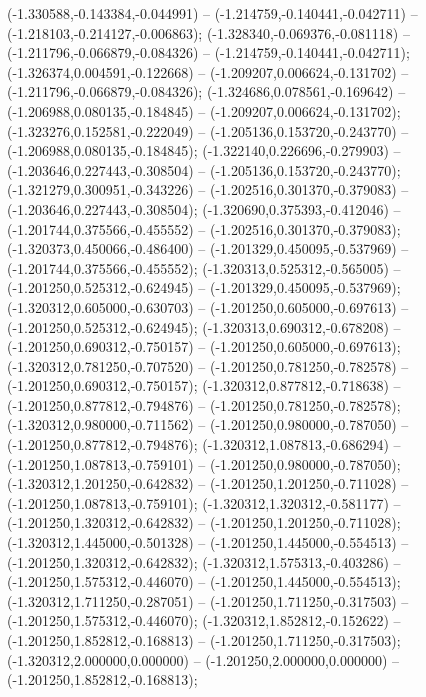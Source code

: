  (-1.330588,-0.143384,-0.044991) -- (-1.214759,-0.140441,-0.042711) -- (-1.218103,-0.214127,-0.006863);
 (-1.328340,-0.069376,-0.081118) -- (-1.211796,-0.066879,-0.084326) -- (-1.214759,-0.140441,-0.042711);
 (-1.326374,0.004591,-0.122668) -- (-1.209207,0.006624,-0.131702) -- (-1.211796,-0.066879,-0.084326);
 (-1.324686,0.078561,-0.169642) -- (-1.206988,0.080135,-0.184845) -- (-1.209207,0.006624,-0.131702);
 (-1.323276,0.152581,-0.222049) -- (-1.205136,0.153720,-0.243770) -- (-1.206988,0.080135,-0.184845);
 (-1.322140,0.226696,-0.279903) -- (-1.203646,0.227443,-0.308504) -- (-1.205136,0.153720,-0.243770);
 (-1.321279,0.300951,-0.343226) -- (-1.202516,0.301370,-0.379083) -- (-1.203646,0.227443,-0.308504);
 (-1.320690,0.375393,-0.412046) -- (-1.201744,0.375566,-0.455552) -- (-1.202516,0.301370,-0.379083);
 (-1.320373,0.450066,-0.486400) -- (-1.201329,0.450095,-0.537969) -- (-1.201744,0.375566,-0.455552);
 (-1.320313,0.525312,-0.565005) -- (-1.201250,0.525312,-0.624945) -- (-1.201329,0.450095,-0.537969);
 (-1.320312,0.605000,-0.630703) -- (-1.201250,0.605000,-0.697613) -- (-1.201250,0.525312,-0.624945);
 (-1.320313,0.690312,-0.678208) -- (-1.201250,0.690312,-0.750157) -- (-1.201250,0.605000,-0.697613);
 (-1.320312,0.781250,-0.707520) -- (-1.201250,0.781250,-0.782578) -- (-1.201250,0.690312,-0.750157);
 (-1.320312,0.877812,-0.718638) -- (-1.201250,0.877812,-0.794876) -- (-1.201250,0.781250,-0.782578);
 (-1.320312,0.980000,-0.711562) -- (-1.201250,0.980000,-0.787050) -- (-1.201250,0.877812,-0.794876);
 (-1.320312,1.087813,-0.686294) -- (-1.201250,1.087813,-0.759101) -- (-1.201250,0.980000,-0.787050);
 (-1.320312,1.201250,-0.642832) -- (-1.201250,1.201250,-0.711028) -- (-1.201250,1.087813,-0.759101);
 (-1.320312,1.320312,-0.581177) -- (-1.201250,1.320312,-0.642832) -- (-1.201250,1.201250,-0.711028);
 (-1.320312,1.445000,-0.501328) -- (-1.201250,1.445000,-0.554513) -- (-1.201250,1.320312,-0.642832);
 (-1.320312,1.575313,-0.403286) -- (-1.201250,1.575312,-0.446070) -- (-1.201250,1.445000,-0.554513);
 (-1.320312,1.711250,-0.287051) -- (-1.201250,1.711250,-0.317503) -- (-1.201250,1.575312,-0.446070);
 (-1.320312,1.852812,-0.152622) -- (-1.201250,1.852812,-0.168813) -- (-1.201250,1.711250,-0.317503);
 (-1.320312,2.000000,0.000000) -- (-1.201250,2.000000,0.000000) -- (-1.201250,1.852812,-0.168813);
